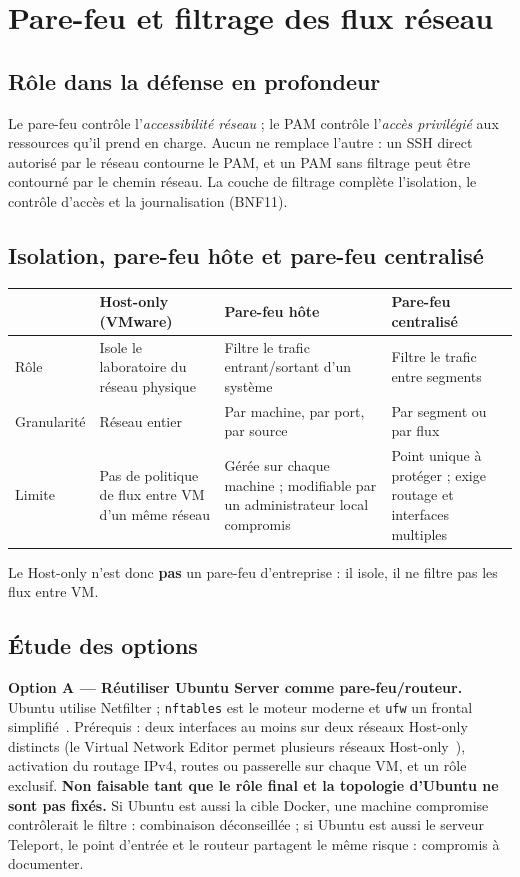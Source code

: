 \documentclass[11pt,a4paper]{report}
\begin{document}
\section{Pare-feu et filtrage des flux réseau}\label{sec:pf}
\subsection{Rôle dans la défense en profondeur}
Le pare-feu contrôle l'\emph{accessibilité réseau} ; le PAM contrôle l'\emph{accès privilégié} aux ressources qu'il prend en charge. Aucun ne remplace l'autre : un SSH direct autorisé par le réseau contourne le PAM, et un PAM sans filtrage peut être contourné par le chemin réseau. La couche de filtrage complète l'isolation, le contrôle d'accès et la journalisation (BNF11).

\subsection{Isolation, pare-feu hôte et pare-feu centralisé}
\begin{tabularx}{\textwidth}{@{}p{2.8cm}XXX@{}}
\toprule & \textbf{Host-only (VMware)} & \textbf{Pare-feu hôte} & \textbf{Pare-feu centralisé}\\ \midrule
Rôle & Isole le laboratoire du réseau physique~\cite{vmware-ho} & Filtre le trafic entrant/sortant d'un système & Filtre le trafic entre segments\\
Granularité & Réseau entier & Par machine, par port, par source & Par segment ou par flux\\
Limite & Pas de politique de flux entre VM d'un même réseau & Gérée sur chaque machine ; modifiable par un administrateur local compromis & Point unique à protéger ; exige routage et interfaces multiples\\
\bottomrule
\end{tabularx}

Le Host-only n'est donc \textbf{pas} un pare-feu d'entreprise : il isole, il ne filtre pas les flux entre VM.

\subsection{Étude des options}\label{sec:optab}
\textbf{Option A --- Réutiliser Ubuntu Server comme pare-feu/routeur.} Ubuntu utilise Netfilter ; \texttt{nftables} est le moteur moderne et \texttt{ufw} un frontal simplifié~\cite{ubuntu-fw}. Prérequis : deux interfaces au moins sur deux réseaux Host-only distincts (le Virtual Network Editor permet plusieurs réseaux Host-only~\cite{vmware-multi}), activation du routage IPv4, routes ou passerelle sur chaque VM, et un rôle exclusif. \textbf{Non faisable tant que le rôle final et la topologie d'Ubuntu ne sont pas fixés.} Si Ubuntu est aussi la cible Docker, une machine compromise contrôlerait le filtre : combinaison déconseillée ; si Ubuntu est aussi le serveur Teleport, le point d'entrée et le routeur partagent le même risque : compromis à documenter.
\end{document}
